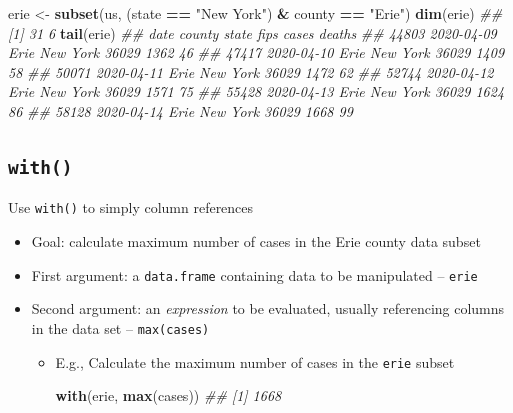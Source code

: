 \documentclass[
]{book}
\newenvironment{Shaded}{\begin{snugshade}}{\end{snugshade}}
\newcommand{\CommentTok}[1]{\textcolor[rgb]{0.56,0.35,0.01}{\textit{#1}}}
\newcommand{\KeywordTok}[1]{\textcolor[rgb]{0.13,0.29,0.53}{\textbf{#1}}}
\newcommand{\NormalTok}[1]{#1}
\newcommand{\OperatorTok}[1]{\textcolor[rgb]{0.81,0.36,0.00}{\textbf{#1}}}
\newcommand{\StringTok}[1]{\textcolor[rgb]{0.31,0.60,0.02}{#1}}
\begin{document}
\begin{itemize}
\begin{Shaded}
\begin{Highlighting}[]
\NormalTok{erie <-}\StringTok{ }\KeywordTok{subset}\NormalTok{(us, (state }\OperatorTok{==}\StringTok{ "New York"}\NormalTok{) }\OperatorTok{&}\StringTok{ }\NormalTok{county }\OperatorTok{==}\StringTok{ "Erie"}\NormalTok{)}
\KeywordTok{dim}\NormalTok{(erie)}
\CommentTok{## [1] 31  6}
\KeywordTok{tail}\NormalTok{(erie)}
\CommentTok{##             date county    state  fips cases deaths}
\CommentTok{## 44803 2020-04-09   Erie New York 36029  1362     46}
\CommentTok{## 47417 2020-04-10   Erie New York 36029  1409     58}
\CommentTok{## 50071 2020-04-11   Erie New York 36029  1472     62}
\CommentTok{## 52744 2020-04-12   Erie New York 36029  1571     75}
\CommentTok{## 55428 2020-04-13   Erie New York 36029  1624     86}
\CommentTok{## 58128 2020-04-14   Erie New York 36029  1668     99}
\end{Highlighting}
\end{Shaded}
\end{itemize}

\hypertarget{with}{%
\subsection*{\texorpdfstring{\texttt{with()}}{with()}}\label{with}}

Use \texttt{with()} to simply column references

\begin{itemize}
\item
  Goal: calculate maximum number of cases in the Erie county data subset
\item
  First argument: a \texttt{data.frame} containing data to be manipulated -- \texttt{erie}
\item
  Second argument: an \emph{expression} to be evaluated, usually referencing columns in the data set -- \texttt{max(cases)}

  \begin{itemize}
  \item
    E.g., Calculate the maximum number of cases in the \texttt{erie} subset

\begin{Shaded}
\begin{Highlighting}[]
\KeywordTok{with}\NormalTok{(erie, }\KeywordTok{max}\NormalTok{(cases))}
\CommentTok{## [1] 1668}
\end{Highlighting}
\end{Shaded}
  \end{itemize}
\end{itemize}
\end{document}
